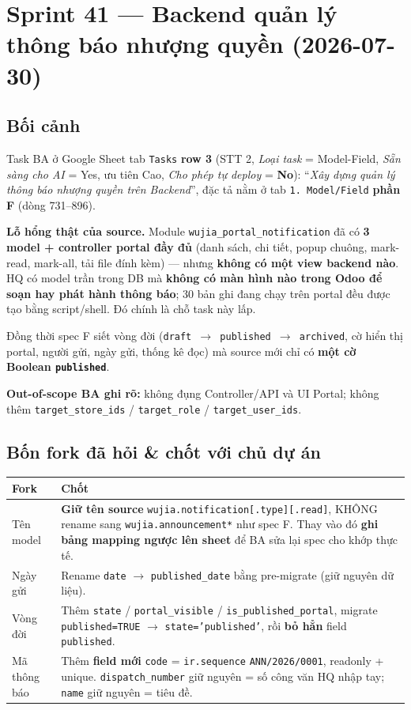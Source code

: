 \chapter{Sprint 41 --- Backend quản lý thông báo nhượng quyền (2026-07-30)}

\section{Bối cảnh}

Task BA ở Google Sheet tab \texttt{Tasks} \textbf{row 3} (STT 2, \emph{Loại task} = Model-Field,
\emph{Sẵn sàng cho AI} = Yes, ưu tiên Cao, \emph{Cho phép tự deploy} = \textbf{No}):
``\emph{Xây dựng quản lý thông báo nhượng quyền trên Backend}'', đặc tả nằm ở tab
\texttt{1. Model/Field} \textbf{phần F} (dòng 731--896).

\textbf{Lỗ hổng thật của source.} Module \texttt{wujia\_portal\_notification} đã có \textbf{3 model
+ controller portal đầy đủ} (danh sách, chi tiết, popup chuông, mark-read, mark-all, tải file
đính kèm) --- nhưng \textbf{không có một view backend nào}. HQ có model trần trong DB mà
\textbf{không có màn hình nào trong Odoo để soạn hay phát hành thông báo}; 30 bản ghi đang chạy
trên portal đều được tạo bằng script/shell. Đó chính là chỗ task này lấp.

Đồng thời spec F siết vòng đời (\texttt{draft $\to$ published $\to$ archived}, cờ hiển thị portal,
người gửi, ngày gửi, thống kê đọc) mà source mới chỉ có \textbf{một cờ Boolean \texttt{published}}.

\textbf{Out-of-scope BA ghi rõ:} không đụng Controller/API và UI Portal; không thêm
\texttt{target\_store\_ids} / \texttt{target\_role} / \texttt{target\_user\_ids}.

\section{Bốn fork đã hỏi \& chốt với chủ dự án}

\begin{center}
\begin{tabular}{p{3.2cm}p{10.5cm}}
\hline
\textbf{Fork} & \textbf{Chốt} \\
\hline
Tên model & \textbf{Giữ tên source} \texttt{wujia.notification[.type][.read]}, KHÔNG rename sang
\texttt{wujia.announcement*} như spec F. Thay vào đó \textbf{ghi bảng mapping ngược lên sheet} để
BA sửa lại spec cho khớp thực tế. \\
Ngày gửi & Rename \texttt{date} $\to$ \texttt{published\_date} bằng pre-migrate (giữ nguyên dữ liệu). \\
Vòng đời & Thêm \texttt{state} / \texttt{portal\_visible} / \texttt{is\_published\_portal},
migrate \texttt{published=TRUE} $\to$ \texttt{state='published'}, rồi \textbf{bỏ hẳn}
field \texttt{published}. \\
Mã thông báo & Thêm \textbf{field mới} \texttt{code} = \texttt{ir.sequence}
\texttt{ANN/2026/0001}, readonly + unique. \texttt{dispatch\_number} giữ nguyên = số công văn HQ
nhập tay; \texttt{name} giữ nguyên = tiêu đề. \\
\hline
\end{tabular}
\end{center}

